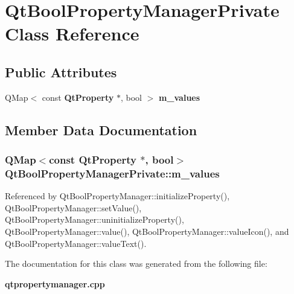 \section{Qt\+Bool\+Property\+Manager\+Private Class Reference}
\label{classQtBoolPropertyManagerPrivate}
\subsection*{Public Attributes}
\begin{DoxyCompactItemize}
\item 
Q\+Map$<$ const {\bf Qt\+Property} $\ast$, bool $>$ {\bf m\+\_\+values}
\end{DoxyCompactItemize}


\subsection{Member Data Documentation}
\subsubsection[{m\+\_\+values}]{\setlength{\rightskip}{0pt plus 5cm}Q\+Map$<$const {\bf Qt\+Property} $\ast$, bool$>$ Qt\+Bool\+Property\+Manager\+Private\+::m\+\_\+values}\label{classQtBoolPropertyManagerPrivate_a50c26c23f2a4fd7f3910f86084fdc7c2}


Referenced by Qt\+Bool\+Property\+Manager\+::initialize\+Property(), Qt\+Bool\+Property\+Manager\+::set\+Value(), Qt\+Bool\+Property\+Manager\+::uninitialize\+Property(), Qt\+Bool\+Property\+Manager\+::value(), Qt\+Bool\+Property\+Manager\+::value\+Icon(), and Qt\+Bool\+Property\+Manager\+::value\+Text().



The documentation for this class was generated from the following file\+:\begin{DoxyCompactItemize}
\item 
{\bf qtpropertymanager.\+cpp}\end{DoxyCompactItemize}
